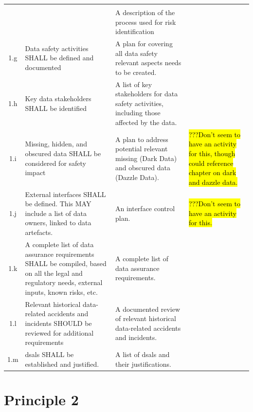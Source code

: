 {\begin{longtable}{|C{}|L{}|L{}|}
	   \\ %
	 & & %
		A description of the process used for risk identification & %
		\\\hline
	1.g & %
	  Data safety activities SHALL be defined and documented &%
	  A plan for covering all data safety relevant aspects needs to be created. &%
	  \\\hline
	1.h & %
	  Key data stakeholders SHALL be identified &%
	  A list of key stakeholders for data safety activities, including those affected by the data. & %
	  \\\hline
	1.i & %
	  Missing, hidden, and obscured data SHALL be considered for safety impact &%
	  A plan to address potential relevant missing (Dark Data) and obscured data (Dazzle Data).&%
	  \hl{???Don't seem to have an activity for this, though could reference chapter on dark and dazzle data.} %
	  \\\hline
	1.j & %
	  External interfaces SHALL be defined. This MAY include a list of data owners, linked to data artefacts.&%
	  An interface control plan. &%
	  \hl{???Don't seem to have an activity for this.}
	  \\\hline
	1.k & %
	  A complete list of data assurance requirements SHALL be compiled, based on all the legal and regulatory needs, external inputs, known risks, etc. & %
	  A complete list of data assurance requirements. &
	  \\\hline
	1.l & %
	  Relevant historical data-related accidents and incidents SHOULD be reviewed for additional requirements &%
	  A documented review of relevant historical data-related accidents and incidents. &%
	  \\\hline
	1.m & %
	  \glspl{dsal} SHALL be established and justified.&%
	  A list of \glspl{dsal} and their justifications.&%
	  \\\hline
\end{longtable}
\cbend

\section{Principle 2}

}
